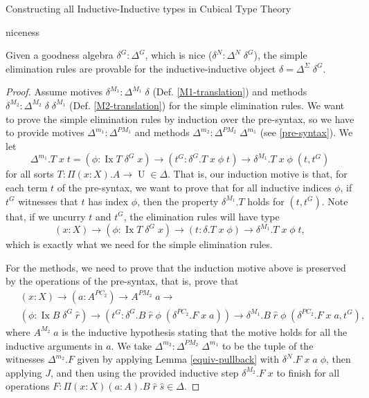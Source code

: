 \documentclass[acmsmall,review]{acmart}\settopmatter{printfolios=true,printccs=false,printacmref=false}
\DeclareMathOperator{\UU}{U}
\DeclareMathOperator{\Ix}{Ix}
\begin{document}
\begin{section}{Constructing all Inductive-Inductive types in Cubical Type Theory}
\begin{subsection}{niceness}
\begin{lemma}
Given a goodness algebra $\delta^G : \Delta^G$, which is nice ($\delta^N : \Delta^N\;\delta^G$), the simple elimination rules are provable for the inductive-inductive object $\delta = \Delta^\Sigma\;\delta^G$.
\end{lemma}
\begin{proof}
Assume motives $\delta^{M_1} : \Delta^{M_1}\;\delta$ (Def. \ref{M1-translation}) and methods $\delta^{M_2} : \Delta^{M_2}\;\delta\;\delta^{M_1}$ (Def. \ref{M2-translation}) for the simple elimination rules. We want to prove the simple elimination rules by induction over the pre-syntax, so we have to provide motives $\Delta^{m_1} : \Delta^{PM_1}$ and methods $\Delta^{m_2} : \Delta^{PM_2}\;\Delta^{m_1}$ (see \ref{pre-syntax}).
We let \[\Delta^{m_1}.T\;x\;t = (\phi : \Ix T \;\delta^G\;x) \to (t^G : \delta^G.T\;x\;\phi\;t) \to \delta^{M_1}.T\;x\;\phi\;(t , t^G)\] for all sorts $T : \Pi(x : X).A \to \UU\in\Delta$. That is, our induction motive is that, for each term $t$ of the pre-syntax, we want to prove that for all inductive indices $\phi$, if $t^G$ witnesses that $t$ has index $\phi$, then the property $\delta^{M_1}.T$ holds for $(t, t^G)$. Note that, if we uncurry $t$ and $t^G$, the elimination rules will have type \[(x : X) \to (\phi: \Ix T\;\delta^G\;x) \to (t : \delta.T\;x\;\phi) \to \delta^{M_1}.T\;x\;\phi\;t,\] which is exactly what we need for the simple elimination rules.

For the methods, we need to prove that the induction motive above is preserved by the operations of the pre-syntax, that is, prove that \begin{align*}&\; (x : X)\to (a : A^{PC_2}) \to A^{PM_2}\;a \to \\&\; (\phi : \Ix B \;\delta^G\;\hat{r}) \to (t^G : \delta^G.B\;\hat{r}\;\phi\;(\delta^{PC_2}.F\;x\;a)) \to \delta^{M_1}.B\;\hat{r}\;\phi\;(\delta^{PC_2}.F\;x\;a , t^G),\end{align*} where $A^{M_2}\;a$ is the inductive hypothesis stating that the motive holds for all the inductive arguments in $a$. We take $\Delta^{m_2} : \Delta^{PM_2}\;\Delta^{m_1}$ to be the tuple of the witnesses $\Delta^{m_2}.F$ given by applying Lemma \ref{equiv-pullback} with $\delta^N.F\;x\;a\;\phi$, then applying $J$, and then using the provided inductive step $\delta^{M_2}.F\;x$ to finish for all operations $F : \Pi(x : X)(a : A).B\;\hat{r}\;\hat{s}\in\Delta$.


\end{proof}
\end{subsection}
\end{section}
\end{document}
